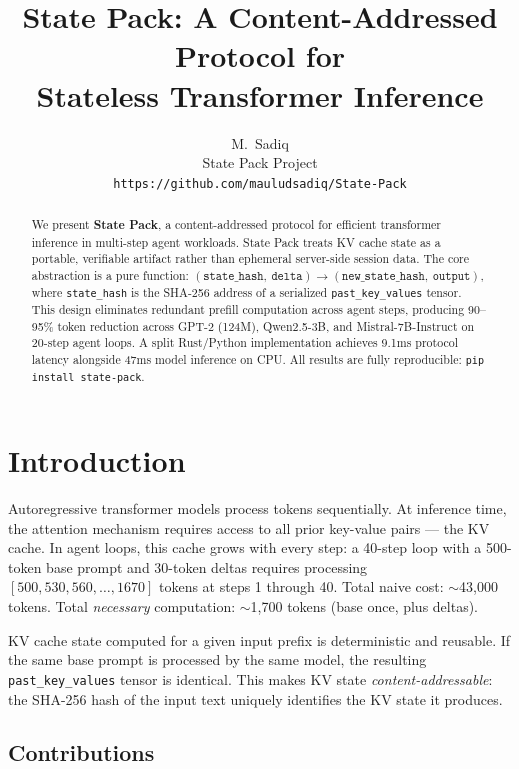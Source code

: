 \documentclass[11pt,a4paper]{article}
\title{State Pack: A Content-Addressed Protocol for\\Stateless Transformer Inference}
\author{%
  M.~Sadiq \\
  State Pack Project \\
  \texttt{https://github.com/mauludsadiq/State-Pack} \\
}
\begin{document}
\maketitle

\begin{abstract}
We present \textbf{State Pack}, a content-addressed protocol for efficient
transformer inference in multi-step agent workloads. State Pack treats KV cache
state as a portable, verifiable artifact rather than ephemeral server-side session
data. The core abstraction is a pure function:
$(\texttt{state\_hash},\ \texttt{delta}) \rightarrow (\texttt{new\_state\_hash},\ \texttt{output})$,
where \texttt{state\_hash} is the SHA-256 address of a serialized
\texttt{past\_key\_values} tensor. This design eliminates redundant prefill
computation across agent steps, producing 90--95\% token reduction across
GPT-2 (124M), Qwen2.5-3B, and Mistral-7B-Instruct on 20-step agent loops.
A split Rust/Python implementation achieves 9.1ms protocol latency alongside
47ms model inference on CPU. All results are fully reproducible:
\texttt{pip install state-pack}.
\end{abstract}

\section{Introduction}
\label{sec:intro}

Autoregressive transformer models process tokens sequentially. At inference
time, the attention mechanism requires access to all prior key-value pairs ---
the KV cache. In agent loops, this cache grows with every step: a 40-step
loop with a 500-token base prompt and 30-token deltas requires processing
$[500, 530, 560, \ldots, 1670]$ tokens at steps 1 through 40. Total naive
cost: $\sim$43,000 tokens. Total \emph{necessary} computation: $\sim$1,700
tokens (base once, plus deltas).

KV cache state computed for a given input prefix is deterministic and
reusable. If the same base prompt is processed by the same model, the
resulting \texttt{past\_key\_values} tensor is identical. This makes KV
state \emph{content-addressable}: the SHA-256 hash of the input text
uniquely identifies the KV state it produces.

\subsection{Contributions}
\end{document}
